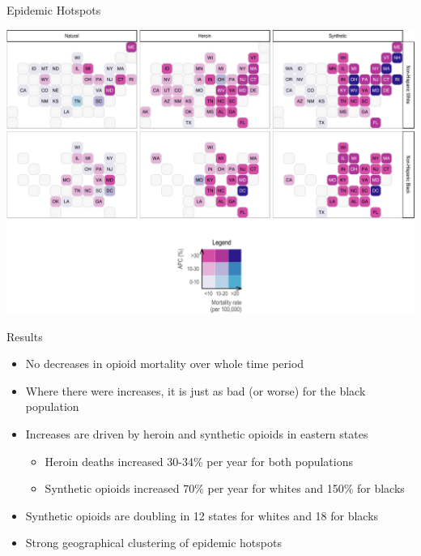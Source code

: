 \documentclass[ignorenonframetext,compress]{beamer}
\providecommand{\tightlist}{%
  \setlength{\itemsep}{0pt}\setlength{\parskip}{0pt}}
\begin{document}
\begin{frame}{Epidemic Hotspots}

\begin{center}\includegraphics{epc_slides_files/figure-beamer/unnamed-chunk-10-1} \end{center}

\end{frame}

\begin{frame}{Results}

\begin{itemize}
\tightlist
\item
  No decreases in opioid mortality over whole time period
\item
  Where there were increases, it is just as bad (or worse) for the black
  population
\item
  Increases are driven by heroin and synthetic opioids in eastern states

  \begin{itemize}
  \tightlist
  \item
    Heroin deaths increased 30-34\% per year for both populations
  \item
    Synthetic opioids increased 70\% per year for whites and 150\% for
    blacks
  \end{itemize}
\item
  Synthetic opioids are doubling in 12 states for whites and 18 for
  blacks
\item
  Strong geographical clustering of epidemic hotspots
\end{itemize}

\end{frame}
\end{document}
